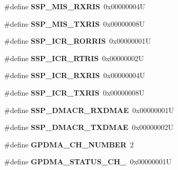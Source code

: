 \begin{DoxyCompactItemize}
\#define {\bfseries S\+S\+P\+\_\+\+M\+I\+S\+\_\+\+R\+X\+R\+IS}~0x00000004U
\item 
\mbox{\label{group__lpc24xx__regs_ga7762086ec51d46f49bba87efc5cf75ed}} 
\#define {\bfseries S\+S\+P\+\_\+\+M\+I\+S\+\_\+\+T\+X\+R\+IS}~0x00000008U
\item 
\mbox{\label{group__lpc24xx__regs_ga2036ebf01ae92149ee7c2d030ec4a2a4}} 
\#define {\bfseries S\+S\+P\+\_\+\+I\+C\+R\+\_\+\+R\+O\+R\+R\+IS}~0x00000001U
\item 
\mbox{\label{group__lpc24xx__regs_ga07d9a6d9a6458dd7c80a6f84c8e0bca9}} 
\#define {\bfseries S\+S\+P\+\_\+\+I\+C\+R\+\_\+\+R\+T\+R\+IS}~0x00000002U
\item 
\mbox{\label{group__lpc24xx__regs_gac4d5d9e68a0e9b61d2a5e3e0fc23622b}} 
\#define {\bfseries S\+S\+P\+\_\+\+I\+C\+R\+\_\+\+R\+X\+R\+IS}~0x00000004U
\item 
\mbox{\label{group__lpc24xx__regs_gaa392a9a677f6c22c84f33504b40515a6}} 
\#define {\bfseries S\+S\+P\+\_\+\+I\+C\+R\+\_\+\+T\+X\+R\+IS}~0x00000008U
\item 
\mbox{\label{group__lpc24xx__regs_ga58ea29dfbc722ac827a756ebe49921fd}} 
\#define {\bfseries S\+S\+P\+\_\+\+D\+M\+A\+C\+R\+\_\+\+R\+X\+D\+M\+AE}~0x00000001U
\item 
\mbox{\label{group__lpc24xx__regs_gae6611230a10eed23bf193b5ad30a475b}} 
\#define {\bfseries S\+S\+P\+\_\+\+D\+M\+A\+C\+R\+\_\+\+T\+X\+D\+M\+AE}~0x00000002U
\item 
\mbox{\label{group__lpc24xx__regs_ga8d0ba29a34da91569f319debb55a7da1}} 
\#define {\bfseries G\+P\+D\+M\+A\+\_\+\+C\+H\+\_\+\+N\+U\+M\+B\+ER}~2
\item 
\mbox{\label{group__lpc24xx__regs_ga17ab8c3e56ccdcf4c76ac2b94012490f}} 
\#define {\bfseries G\+P\+D\+M\+A\+\_\+\+S\+T\+A\+T\+U\+S\+\_\+\+C\+H\+\_}~0x00000001U
\item 
\mbox{\label{group__lpc24xx__regs_gaad138a3dbe89fcb5bc7bfed11149a4ca}} 

\end{DoxyCompactItemize}

